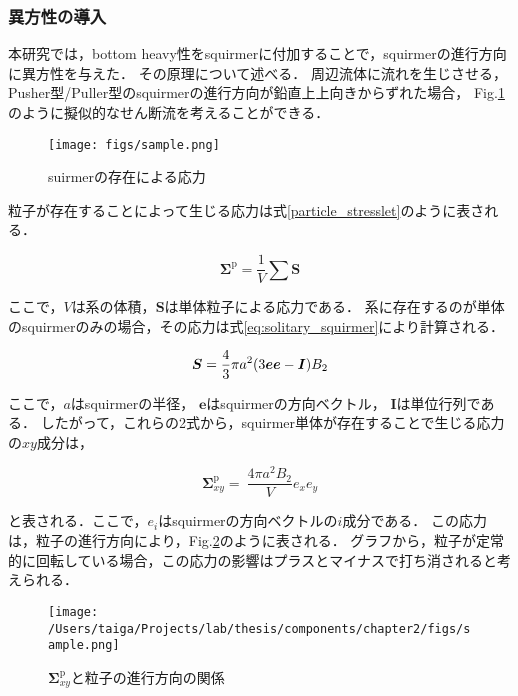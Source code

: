 \subsubsection{異方性の導入}
本研究では，bottom heavy性をsquirmerに付加することで，squirmerの進行方向に異方性を与えた．
その原理について述べる．
周辺流体に流れを生じさせる，Pusher型/Puller型のsquirmerの進行方向が鉛直上上向きからずれた場合，
Fig.\ref{fig:anisotropy}のように擬似的なせん断流を考えることができる．

    \begin{figure}[htbp]
        \texttt{[image: figs/sample.png]}
        \caption{suirmerの存在による応力}
        \label{fig:anisotropy}
    \end{figure}

\noindent
粒子が存在することによって生じる応力は式\eqref{particle_stresslet}のように表される\cite{}．

    \begin{equation}
        \boldsymbol{\Sigma}^\mathrm{p} = \frac{1}{V} \sum \boldsymbol{S}
        \label{particle_stresslet}
    \end{equation}

\noindent
ここで，$V$は系の体積，$\boldsymbol{S}$は単体粒子による応力である．
系に存在するのが単体のsquirmerのみの場合，その応力は式\eqref{eq:solitary_squirmer}により計算される\cite{}．

    \begin{equation}
        \boldsymbol{S} = \\
            \frac{4}{3} \pi a^2 (3 \boldsymbol{e} \boldsymbol{e} - \boldsymbol{I}) B_2
        \label{eq:solitary_squirmer}
    \end{equation}

\noindent
ここで，$a$はsquirmerの半径，
$\boldsymbol{e}$はsquirmerの方向ベクトル，
$\boldsymbol{I}$は単位行列である．
したがって，これらの2式から，squirmer単体が存在することで生じる応力の$xy$成分は，

    \begin{equation}
        \boldsymbol{\Sigma}^\mathrm{p}_{xy} = \
            \frac{4 \pi a^2 B_2}{V} e_x e_y
    \end{equation}

と表される．ここで，$e_i$はsquirmerの方向ベクトルの$i$成分である．
この応力は，粒子の進行方向により，Fig.\ref{fig:graph_particle_stresslet}のように表される．
グラフから，粒子が定常的に回転している場合，この応力の影響はプラスとマイナスで打ち消されると考えられる．

    \begin{figure}[htbp]
        \texttt{[image: /Users/taiga/Projects/lab/thesis/components/chapter2/figs/sample.png]}
        \caption{$\boldsymbol{\Sigma}^\mathrm{p}_{xy}$と粒子の進行方向の関係}
        \label{fig:graph_particle_stresslet}
    \end{figure}

